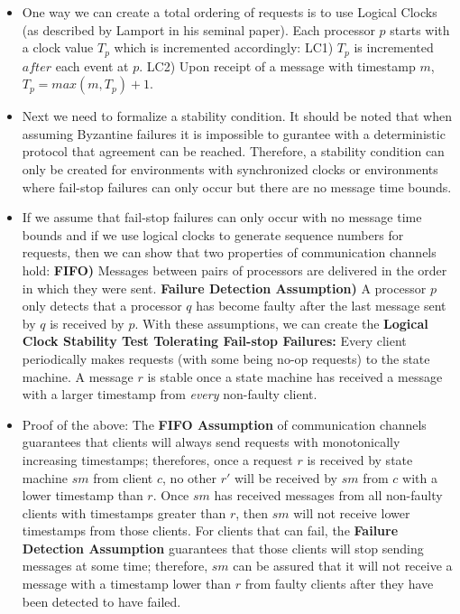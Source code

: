\documentclass[a4paper]{article}
\begin{document}
\begin{itemize}
\begin{itemize}
\begin{itemize}
\item One way we can create a total ordering of requests is to use Logical Clocks (as described by Lamport in his seminal paper). Each processor $p$ starts with a clock value $T_p$ which is incremented accordingly: LC1) $T_p$ is incremented $after$ each event at $p$. LC2) Upon receipt of a message with timestamp $m$, $T_p = max(m, T_p) + 1$.

\item Next we need to formalize a stability condition. It should be noted that when assuming Byzantine failures it is impossible to gurantee with a deterministic protocol that agreement can be reached. Therefore, a stability condition can only be created for environments with synchronized clocks or environments where fail-stop failures can only occur but there are no message time bounds.

\item If we assume that fail-stop failures can only occur with no message time bounds and if we use logical clocks to generate sequence numbers for requests, then we can show that two properties of communication channels hold: \textbf{FIFO)} Messages between pairs of processors are delivered in the order in which they were sent. \textbf{Failure Detection Assumption)} A processor $p$ only detects that a processor $q$ has become faulty after the last message sent by $q$ is received by $p$. With these assumptions, we can create the \textbf{Logical Clock Stability Test Tolerating Fail-stop Failures:} Every client periodically makes requests (with some being no-op requests) to the state machine. A message $r$ is stable once a state machine has received a message with a larger timestamp from \textit{every} non-faulty client.

\item Proof of the above: The \textbf{FIFO Assumption} of communication channels guarantees that clients will always send requests with monotonically increasing timestamps; therefores, once a request $r$ is received by state machine $sm$ from client $c$, no other $r'$ will be received by $sm$ from $c$ with a lower timestamp than $r$. Once $sm$ has received messages from all non-faulty clients with timestamps greater than $r$, then $sm$ will not receive lower timestamps from those clients. For clients that can fail, the \textbf{Failure Detection Assumption} guarantees that those clients will stop sending messages at some time; therefore, $sm$ can be assured that it will not receive a message with a timestamp lower than $r$ from faulty clients after they have been detected to have failed.


\end{itemize}
\end{itemize}
\end{itemize}
\end{document}
